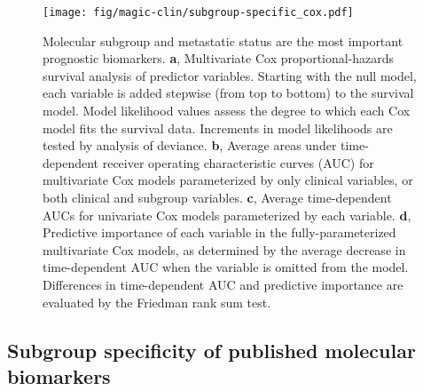 \documentclass[11pt,letterpaper]{article}
\theoremstyle{definition}
\begin{document}
\begin{figure}[h]
	\begin{center}
		\texttt{[image: fig/magic-clin/subgroup-specific\_cox.pdf]}
	\end{center}
	\caption[Molecular subgroup and metastatic status are the most important prognostic biomarkers]
	{
	Molecular subgroup and metastatic status are the most important prognostic biomarkers.
	\textbf{a}, Multivariate Cox proportional-hazards survival analysis of predictor variables. Starting with the null model, each variable is added stepwise (from top to bottom) to the survival model. Model likelihood values assess the degree to which each Cox model fits the survival data. Increments in model likelihoods are tested by analysis of deviance. 
	\textbf{b}, Average areas under time-dependent receiver operating characteristic curves (AUC) for multivariate Cox models parameterized by only clinical variables, or both clinical and subgroup variables.
	\textbf{c}, Average time-dependent AUCs for univariate Cox models parameterized by each variable.
	\textbf{d}, Predictive importance of each variable in the fully-parameterized multivariate Cox models, as determined by the average decrease in time-dependent AUC when the variable is omitted from the model.
	Differences in time-dependent AUC and predictive importance are evaluated by the Friedman rank sum test.
	}
	\label{fig:subgroup-specific_cox}
\end{figure}

\clearpage

\subsection{Subgroup specificity of published molecular biomarkers}
\end{document}
